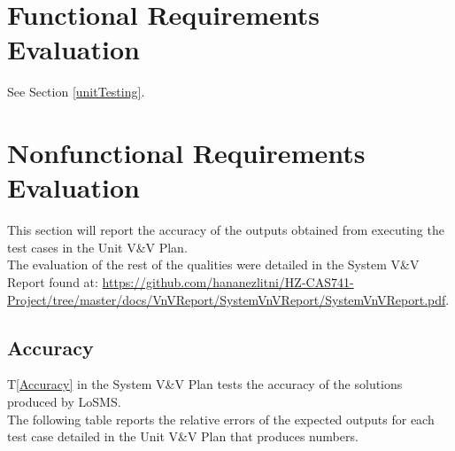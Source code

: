 \documentclass[12pt, titlepage]{article}
\newcommand{\famname}{LoSMS}
\begin{document}
\section{Functional Requirements Evaluation} \label{FunReqsEval}

See Section \ref{unitTesting}.

\section{Nonfunctional Requirements Evaluation} \label{NonFunReqsEval}

This section will report the accuracy of the outputs obtained from executing 
the test cases in the Unit V\&V Plan. \\

The evaluation of the rest of the qualities were detailed in the System V\&V 
Report found at: 
\url{https://github.com/hananezlitni/HZ-CAS741-Project/tree/master/docs/VnVReport/SystemVnVReport/SystemVnVReport.pdf}.

\subsection{Accuracy}

T\ref{Accuracy} in the System V\&V Plan tests the accuracy of the solutions 
produced by \famname{}. \\

The following table reports the relative errors of the expected outputs for 
each test case detailed in the Unit V\&V Plan that produces numbers. \\
\end{document}
